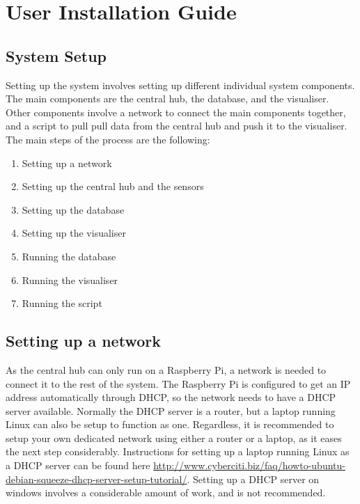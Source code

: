 \documentclass[../document.tex]{subfiles}
\begin{document}
\section{User Installation Guide}

\subsection{System Setup}
Setting up the system involves setting up different individual system components. The main components are the central hub, the database, and the visualiser. Other components involve a network to connect the main components together, and a script to pull pull data from the central hub and push it to the visualiser. The main steps of the process are the following:
\begin{enumerate}
\item Setting up a network

\item Setting up the central hub and the sensors

\item Setting up the database

\item Setting up the visualiser

\item Running the database
\item Running the visualiser
\item Running the script
\end{enumerate}



\subsection{Setting up a network}
As the central hub can only run on a \gls{Raspberry Pi}, a network is needed to connect it to the rest of the system. The \gls{Raspberry Pi} is configured to get an IP address automatically through \gls{DHCP}, so the network needs to have a \gls{DHCP} server available. Normally the \gls{DHCP} server is a router, but a laptop running Linux can also be setup to function as one. Regardless, it is recommended to setup your own dedicated network using either a router or a laptop, as it eases the next step considerably. Instructions for setting up a laptop running Linux as a \gls{DHCP} server can be found here \url{http://www.cyberciti.biz/faq/howto-ubuntu-debian-squeeze-dhcp-server-setup-tutorial/}.
Setting up a \gls{DHCP} server on windows involves a considerable amount of work, and is not recommended.
\end{document}
